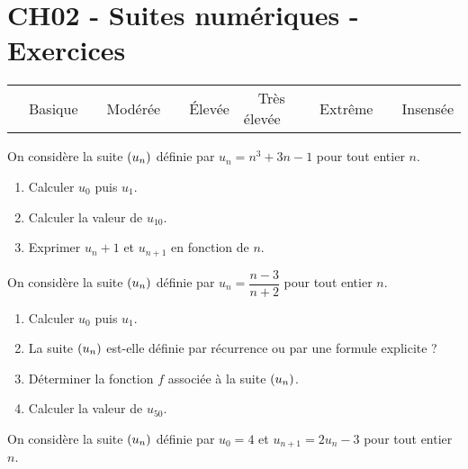 \documentclass[a4paper,11pt]{article}
\author{Pierquet}
\title{\nomfichier}
\begin{document}
\pagestyle{fancy}

\part{CH02 - Suites numériques - Exercices}

\smallskip

\begin{caide}
{\setlength\arrayrulewidth{1.5pt} 
\begin{tabularx}{\linewidth}{Y|Y|Y|Y|Y|Y}
	~~\textsf{Basique} & ~~\textsf{Modérée} & ~~\textsf{Élevée} & ~~\textsf{Très élevée} & ~~\textsf{Extrême} & ~~\textsf{Insensée} \\
\end{tabularx}}
\end{caide}


\medskip

On considère la suite $\left( u_n \right)$ définie par $u_n = n^3+3n-1$ pour tout entier $n$.

\begin{enumerate}[itemsep=0pt]
	\item Calculer $u_0$ puis $u_1$.
	\item Calculer la valeur de $u_{10}$.
	\item Exprimer $u_n + 1$ et $u_{n+1}$ en fonction de $n$.
\end{enumerate}

\medskip


\medskip

On considère la suite $\left( u_n \right)$ définie par $u_n=\dfrac{n-3}{n+2}$ pour tout entier $n$.

\begin{enumerate}[itemsep=0pt]
	\item Calculer $u_0$ puis $u_1$.
	\item La suite $\left( u_n \right)$ est-elle définie par récurrence ou par une formule explicite ?
	\item Déterminer la fonction $f$ associée à la suite $\left( u_n \right)$.
	\item Calculer la valeur de $u_{50}$.
\end{enumerate}

\medskip


\medskip

On considère la suite $\left( u_n \right)$ définie par $u_0=4$ et $u_{n+1}=2u_n-3$ pour tout entier $n$.
\end{document}
